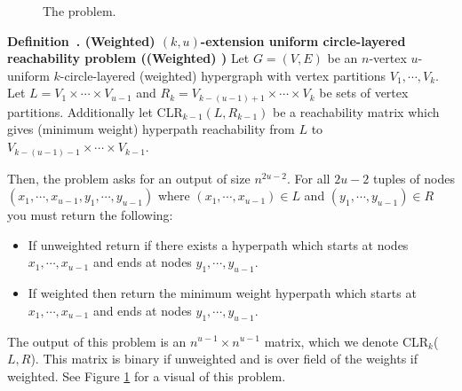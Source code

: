 \documentclass[11pt,letterpaper,pdftex]{article}
\newcounter{definition}
\newenvironment{definition}[1][]{\refstepcounter{definition}\par\medskip
   \noindent \textbf{Definition~\thedefinition. #1} \rmfamily}{\medskip}
\begin{document}
\begin{figure}[ht]
    \centering
    \caption{The  problem.}
    \label{fig:ECLR}
\end{figure}

\begin{definition}[(Weighted) $(k,u)$-extension uniform circle-layered reachability problem ((Weighted) \uECLR{u}{k})] \label{def: uk-ECLR}
Let $G=(V,E)$ be an $n$-vertex $u$-uniform $k$-circle-layered (weighted) hypergraph with vertex partitions $V_1, \cdots, V_{k}$. 
Let $L=V_1 \times \cdots \times V_{u-1}$ and $R_k=V_{k-(u-1)+1} \times \cdots \times V_{k}$ be sets of vertex partitions.
Additionally let CLR$_{k-1}(L, R_{k-1})$ be a reachability matrix which gives (minimum weight) hyperpath reachability from $L$ to $V_{k-(u-1)-1} \times \cdots \times V_{k-1}$.

Then, the  problem asks for an output of size $n^{2u-2}$. 
For all $2u-2$ tuples of nodes \\
$(x_1, \cdots, x_{u-1}, y_1, \cdots, y_{u-1})$  where $(x_1, \cdots, x_{u-1}) \in L$ and  $(y_1, \cdots, y_{u-1}) \in R$ you must return the following:
\begin{itemize}
    \item If unweighted return if there exists a hyperpath which starts at nodes $x_1, \cdots, x_{u-1}$ and ends at nodes $ y_1, \cdots, y_{u-1}$. 
    \item If weighted then return the minimum weight hyperpath which starts at $x_1, \cdots, x_{u-1}$ and ends at nodes $ y_1, \cdots, y_{u-1}$. 
\end{itemize}
  
The output of this problem is an $n^{u-1} \times n^{u-1}$ matrix, which we denote CLR$_k$($L,R$). This matrix is binary if unweighted and is over field of the weights if weighted. See Figure \ref{fig:ECLR} for a visual of this problem. 
\end{definition}
\end{document}
